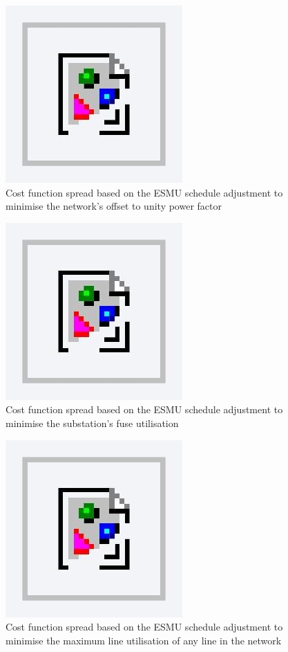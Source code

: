 \begin{figure}\centering
	\includegraphics{foo} %
	\caption{Cost function spread based on the ESMU schedule adjustment to minimise the network's offset to unity power factor}
\end{figure}

\begin{figure}\centering
	\includegraphics{foo} %
	\caption{Cost function spread based on the ESMU schedule adjustment to minimise the substation's fuse utilisation}
\end{figure}

\begin{figure}\centering
	\includegraphics{foo} %
	\caption{Cost function spread based on the ESMU schedule adjustment to minimise the maximum line utilisation of any line in the network}
\end{figure}

